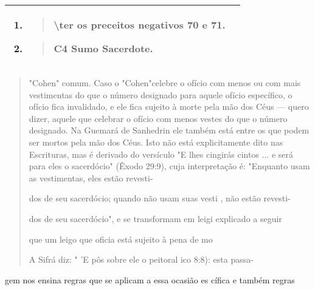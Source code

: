 \begin{longtable}[]{@{}ll@{}}
\toprule
\endhead
\begin{minipage}[t]{0.47\columnwidth}\raggedright
\begin{enumerate}
\def\labelenumi{\arabic{enumi}.}
\setcounter{enumi}{50}
\item
 \begin{quote}
 \textbackslash ter os preceitos negativos 70 e 71.
 \end{quote}
\item
 \begin{quote}
 C4 Sumo Sacerdote.
 \end{quote}
\end{enumerate}\strut
\end{minipage} & \begin{minipage}[t]{0.47\columnwidth}\raggedright
\strut
\end{minipage}\tabularnewline
\bottomrule
\end{longtable}

\begin{quote}


"Cohen" comum. Caso o "Cohen"celebre o ofício com menos ou com mais
vestimentas do que o número designado para aquele ofício específico, o
ofício fica invalidado, e ele fica sujeito à morte pela mão dos Céus ---
quero dizer, aquele que celebrar o ofício com menos vestes do que o
número designado. Na Guemará de Sanhedrin ele também está entre os que
podem ser mortos pela mão dos Céus. Isto não está explicitamente dito
nas Escrituras, mas é derivado do versículo "E lhes cingirás cintos ...
e será para eles o sacerdócio" (Êxodo 29:9), cuja interpretação é:
"Enquanto usam as vestimentas, eles estão revesti-

dos de seu sacerdócio; quando não usam suas vesti , não estão revesti-

dos de seu sacerdócio", e se transformam em leigi explicado a seguir

que um leigo que oficia está sujeito à pena de mo

A Sifrá diz: " 'E pôs sobre ele o peitoral ico 8:8): esta passa-
\end{quote}

gem nos ensina regras que se aplicam a essa ocasião es cífica e também
regras

